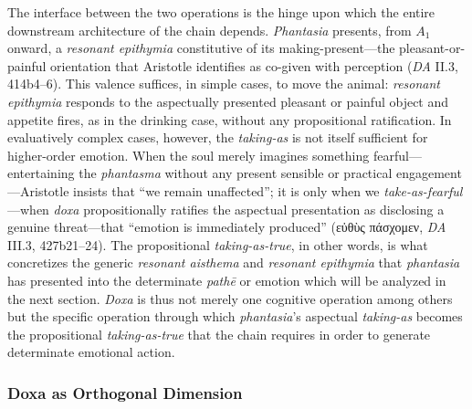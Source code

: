 \documentclass{article}
\newcommand{\gk}[1]{{\greekfont #1}}
\begin{document}
The interface between the two operations is the hinge upon which the entire downstream architecture of the chain depends. \textit{Phantasia} presents, from $A_1$ onward, a \textit{resonant epithymia} constitutive of its making-present---the pleasant-or-painful orientation that Aristotle identifies as co-given with perception (\textit{DA} II.3, 414b4--6). This valence suffices, in simple cases, to move the animal: \textit{resonant epithymia} responds to the aspectually presented pleasant or painful object and appetite fires, as in the drinking case, without any propositional ratification. In evaluatively complex cases, however, the \textit{taking-as} is not itself sufficient for higher-order emotion. When the soul merely imagines something fearful---entertaining the \textit{phantasma} without any present sensible or practical engagement---Aristotle insists that ``we remain unaffected''; it is only when we \textit{take-as-fearful}---when \textit{doxa} propositionally ratifies the aspectual presentation as disclosing a genuine threat---that ``emotion is immediately produced'' (\gk{εὐθὺς πάσχομεν}, \textit{DA} III.3, 427b21--24). The propositional \textit{taking-as-true}, in other words, is what concretizes the generic \textit{resonant aisthema} and \textit{resonant epithymia} that \textit{phantasia} has presented into the determinate \textit{pathē} or emotion which will be analyzed in the next section. \textit{Doxa} is thus not merely one cognitive operation among others but the specific operation through which \textit{phantasia}'s aspectual \textit{taking-as} becomes the propositional \textit{taking-as-true} that the chain requires in order to generate determinate emotional action.

\subsubsection*{Doxa as Orthogonal Dimension}
\end{document}
